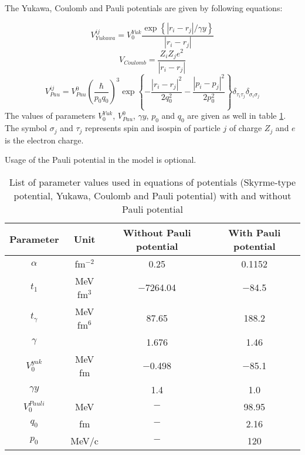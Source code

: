 The Yukawa, Coulomb and Pauli potentials are given by following equations:

\begin{equation}
    V_{Yukawa}^{ij}=V_0^{Yuk}\frac{\exp \left\{\left|r_i-r_j\right|/\gamma y\right\}}{\left|r_i-r_j\right|}
\end{equation}
\begin{equation}
	V_{Coulomb}=\frac{Z_iZ_je^2}{\left|r_i-r_j\right|}
\end{equation}	
\begin{equation}	
	V_{Pau}^{ij}=V_{Pau}^0\left(\frac{\hbar}{p_0q_0}\right)^3 \exp \left\{-\frac{\left|r_i-r_j\right|^2}{2 q_0^2}-\frac{\left|p_i-p_j\right|^2}{2 p_0^2}\right\}\delta_{\tau_i\tau_j}\delta_{\sigma_i\sigma_j}
\end{equation}
The values of parameters $V_0^{Yuk}$, $V_{Pau}^0$, $\gamma y$, $p_0$ and $q_0$ are given as well in table \ref{UrQMD_para}. The symbol $\sigma_j$ and $\tau_j$  represents spin and isospin of particle $j$ of charge $Z_j$ and $e$ is the electron charge.

Usage of the Pauli potential in the model is optional.

\begin{table}[!hbt]
	\centering 
	\caption{\label{UrQMD_para} List of parameter values used in equations of potentials (Skyrme-type potential, Yukawa, Coulomb and Pauli potential) with and without Pauli potential}
	\begin{tabular}{|c|c||cc|}
		\hline
		Parameter& Unit & Without Pauli potential & With Pauli potential\\
		\hline
		\hline
		$\alpha$&fm$^{-2}$ &0.25 &0.1152\\
		$t_1$&MeV fm$^{3}$  &$-$7264.04 &$-$84.5\\
		$t_\gamma$&MeV fm$^{6}$  &87.65& 188.2\\
		$\gamma$&  &1.676 &1.46\\
		$V_0^{yuk}$&MeV fm &$-$0.498&$-$85.1\\
		$\gamma y$& &1.4 &1.0\\
		$V_0^{Pauli}$&MeV &$-$&98.95\\
		$q_0$& fm&$-$&2.16\\
		$p_0$&MeV$/$c &$-$&120\\
		\hline
		\hline
	\end{tabular}
\end{table}




